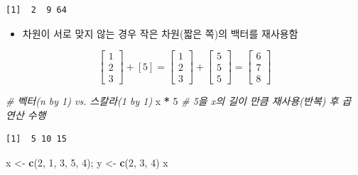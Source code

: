 \documentclass[
  11pt,
]{krantz}
\newenvironment{Shaded}{\begin{snugshade}}{\end{snugshade}}
\newcommand{\CommentTok}[1]{\textcolor[rgb]{0.37,0.37,0.37}{\textit{#1}}}
\newcommand{\DecValTok}[1]{\textcolor[rgb]{0.06,0.06,0.06}{#1}}
\newcommand{\KeywordTok}[1]{\textcolor[rgb]{0.27,0.27,0.27}{\textbf{#1}}}
\newcommand{\NormalTok}[1]{#1}
\newcommand{\OperatorTok}[1]{\textcolor[rgb]{0.43,0.43,0.43}{\textbf{#1}}}
\newcommand{\StringTok}[1]{\textcolor[rgb]{0.5,0.5,0.5}{#1}}
\providecommand{\tightlist}{%
  \setlength{\itemsep}{0pt}\setlength{\parskip}{0pt}}
\begin{document}
\begin{verbatim}
[1]  2  9 64
\end{verbatim}

\normalsize

\begin{itemize}
\tightlist
\item
  차원이 서로 맞지 않는 경우 작은 차원(짧은 쪽)의 백터를 재사용함
\end{itemize}

\[\begin{bmatrix}
1 \\ 2\\ 3
\end{bmatrix} + [5] = 
\begin{bmatrix}
1 \\ 2\\ 3
\end{bmatrix} + 
\begin{bmatrix}
5 \\ 5\\ 5
\end{bmatrix} = 
\begin{bmatrix}
6 \\ 7 \\ 8
\end{bmatrix}
\]

\footnotesize

\begin{Shaded}
\begin{Highlighting}[]
\CommentTok{# 벡터(n by 1) vs. 스칼라(1 by 1)}
\NormalTok{x }\OperatorTok{*}\StringTok{ }\DecValTok{5} \CommentTok{# 5을 x의 길이 만큼 재사용(반복) 후 곱 연산 수행}
\end{Highlighting}
\end{Shaded}

\begin{verbatim}
[1]  5 10 15
\end{verbatim}

\begin{Shaded}
\begin{Highlighting}[]
\NormalTok{x <-}\StringTok{ }\KeywordTok{c}\NormalTok{(}\DecValTok{2}\NormalTok{, }\DecValTok{1}\NormalTok{, }\DecValTok{3}\NormalTok{, }\DecValTok{5}\NormalTok{, }\DecValTok{4}\NormalTok{); y <-}\StringTok{ }\KeywordTok{c}\NormalTok{(}\DecValTok{2}\NormalTok{, }\DecValTok{3}\NormalTok{, }\DecValTok{4}\NormalTok{)}
\NormalTok{x}
\end{Highlighting}
\end{Shaded}
\end{document}
